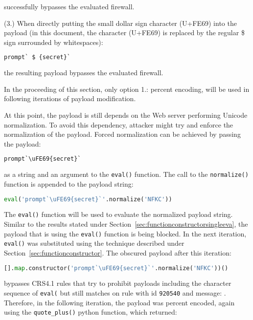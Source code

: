 successfully bypasses the evaluated firewall.

(3.) When directly putting the small dollar sign character (U+FE69) into the payload (in this document, the character (U+FE69) is replaced by the regular \$ sign surrounded by whitespaces):

\begin{lstlisting}[style=basicStyle, language=Python]
prompt` $ {secret}`
\end{lstlisting}

the resulting payload bypasses the evaluated firewall.

In the proceeding of this section, only option 1.: percent encoding, will be used in following iterations of payload modification.

At this point, the payload is still depends on the Web server performing Unicode normalization. To avoid this dependency, attacker might try and enforce the normalization of the payload. Forced normalization can be achieved by passing the payload:

\begin{lstlisting}[style=basicStyle, language=Python]
prompt`\uFE69{secret}`
\end{lstlisting}

as a string and an argument to the \verb|eval()| function. The call to the \verb|normalize()| function is appended to the payload string:

\begin{lstlisting}[style=basicStyle, language=Python]
eval('prompt`\uFE69{secret}`'.normalize('NFKC'))
\end{lstlisting}

The \verb|eval()| function will be used to evaluate the normalized payload string. Similar to the results stated under Section~\ref{sec:functionconstructorsingleeva}, the payload that is using the \verb|eval()| function is being blocked. In the next iteration, \verb|eval()| was substituted using the technique described under Section~\ref{sec:functionconstructor}. The obscured payload after this iteration:

\begin{lstlisting}[style=basicStyle, language=Python]
[].map.constructor('prompt`\uFE69{secret}`'.normalize('NFKC'))()
\end{lstlisting}

bypasses CRS4.1 rules that try to prohibit payloads including the character sequence of \verb|eval(| but still matches on rule with id \verb|920540| and message: . Therefore, in the following iteration, the payload was percent encoded, again using the \verb|quote_plus()| python function, which returned: 

